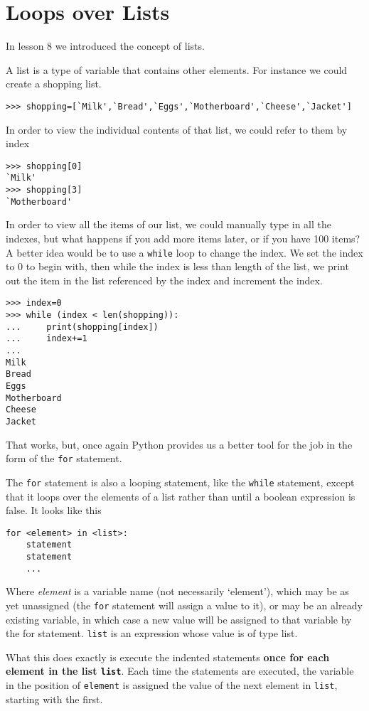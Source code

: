 \section{Loops over Lists}
In lesson 8 we introduced the concept of lists. 

A list is a type of variable that contains other elements. For instance we could create a shopping list. 
\begin{lstlisting}
>>> shopping=[`Milk',`Bread',`Eggs',`Motherboard',`Cheese',`Jacket']
\end{lstlisting}

In order to view the individual contents of that list, we could refer to them by index
\begin{lstlisting}
>>> shopping[0]
`Milk'
>>> shopping[3]
`Motherboard'
\end{lstlisting}

 In order to view all the items of our list, we could manually type in all the indexes, but what happens if you add more items later, or if you have 100 items? A better idea would be to use a \texttt{while} loop to change the index. We set the index to 0 to begin with, then while the index is less than length of the list, we print out the item in the list referenced by the index and increment the index.
\begin{lstlisting}
>>> index=0
>>> while (index < len(shopping)):
...     print(shopping[index])
...     index+=1
... 
Milk
Bread
Eggs
Motherboard
Cheese
Jacket
\end{lstlisting}

That works, but, once again Python provides us a better tool for the job in the form of the \texttt{for} statement.

The \texttt{for} statement is also a looping statement, like the \texttt{while} statement, except that it loops   over the elements of a list rather than until a boolean expression is false. It looks like this
\begin{lstlisting}
for <element> in <list>:
    statement
    statement
    ...
\end{lstlisting}

Where \textit{element} is a variable name (not necessarily `element'),   which may be as yet unassigned (the \texttt{for} statement will assign a value   to it), or may be an already existing variable, in which case a new value   will be assigned to that variable by the for statement. \texttt{list} is an   expression whose value is of type list.

What this does exactly is execute the indented statements \textbf{once for each element in the list \texttt{list}}. Each time the statements are executed, the variable in the position of \texttt{element}   is assigned the value of the next element in \texttt{list}, starting with the   first.


